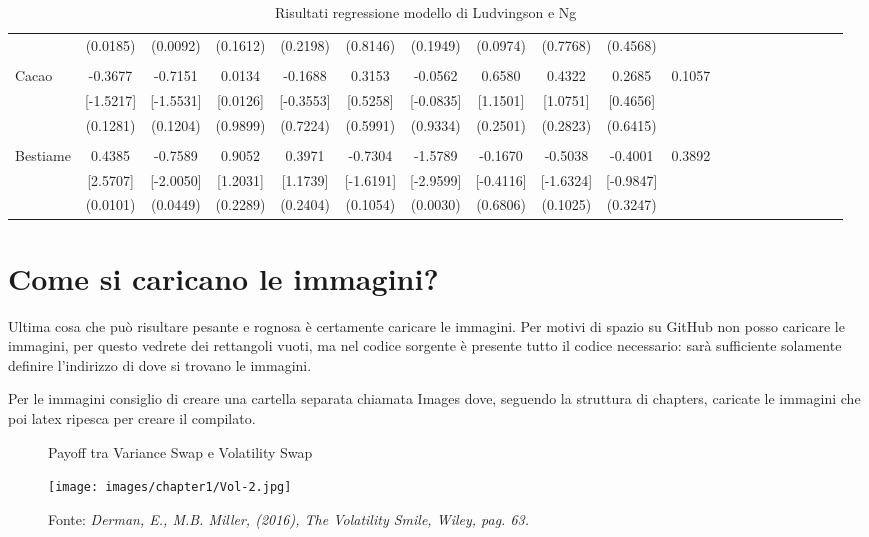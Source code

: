 \begin{sidewaystable}[htpb]
{\begin{tabular}[t]{lccccccccccccccccccc}
& (0.0185) & (0.0092) & (0.1612) & (0.2198) & (0.8146) & (0.1949) & (0.0974) & (0.7768) & (0.4568) & \\
\\
Cacao & -0.3677 & -0.7151 & 0.0134 & -0.1688 & 0.3153 & -0.0562 & 0.6580 & 0.4322 & 0.2685 & 0.1057\\
& [-1.5217] & [-1.5531] & [0.0126] & [-0.3553] & [0.5258] & [-0.0835] & [1.1501] &[1.0751] & [0.4656] &\\
& (0.1281) & (0.1204) & (0.9899) & (0.7224) & (0.5991) & (0.9334) & (0.2501) & (0.2823) & (0.6415) & \\
\\
Bestiame & 0.4385 & -0.7589 & 0.9052 & 0.3971 & -0.7304 & -1.5789 & -0.1670 & -0.5038 & -0.4001 & 0.3892 \\
& [2.5707] & [-2.0050] & [1.2031] & [1.1739] & [-1.6191] & [-2.9599] & [-0.4116] & [-1.6324] & [-0.9847] \\
& (0.0101) & (0.0449) & (0.2289) & (0.2404) & (0.1054) & (0.0030) & (0.6806) & (0.1025) & (0.3247) & \\

\bottomrule
\end{tabular}}
\caption{Risultati regressione modello di Ludvingson e Ng}
\end{sidewaystable}

\section{Come si caricano le immagini?}

Ultima cosa che può risultare pesante e rognosa è certamente caricare le immagini. Per motivi di spazio su GitHub non posso caricare le immagini, per questo vedrete dei rettangoli vuoti, ma nel codice sorgente è presente tutto il codice necessario: sarà sufficiente solamente definire l'indirizzo di dove si trovano le immagini. 

Per le immagini consiglio di creare una cartella separata chiamata Images dove, seguendo la struttura di chapters, caricate le immagini che poi latex ripesca per creare il compilato.

\bigskip
\begin{figure}[h!]
    \centering
    \caption{Payoff tra Variance Swap e Volatility Swap}
    \texttt{[image: images/chapter1/Vol-2.jpg]}
    \caption*{\footnotesize{Fonte: \textit{Derman, E., M.B. Miller, (2016), The Volatility Smile, Wiley, pag. 63.}}}
\end{figure}
\bigskip

